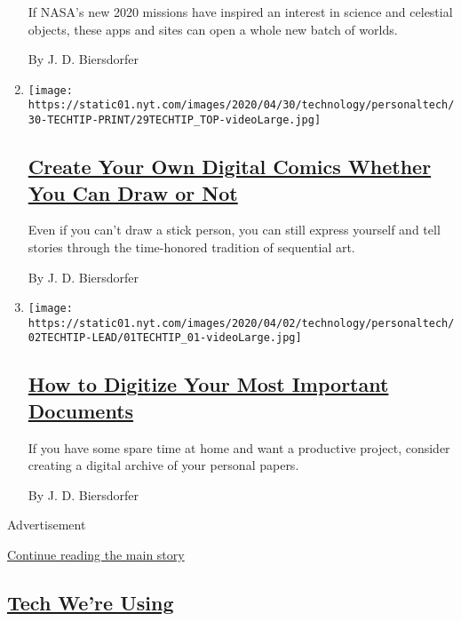 \begin{enumerate}
  If NASA's new 2020 missions have inspired an interest in science and
  celestial objects, these apps and sites can open a whole new batch of
  worlds.

  By J. D. Biersdorfer
\item
  \texttt{[image: https://static01.nyt.com/images/2020/04/30/technology/personaltech/30-TECHTIP-PRINT/29TECHTIP\_TOP-videoLarge.jpg]}

  \hypertarget{create-your-own-digital-comics-whether-you-can-draw-or-not}{%
  \subsection{\texorpdfstring{\href{/2020/04/29/technology/personaltech/create-your-own-digital-comics-whether-you-can-draw-or-not.html}{Create
  Your Own Digital Comics Whether You Can Draw or
  Not}}{Create Your Own Digital Comics Whether You Can Draw or Not}}\label{create-your-own-digital-comics-whether-you-can-draw-or-not}}

  Even if you can't draw a stick person, you can still express yourself
  and tell stories through the time-honored tradition of sequential art.

  By J. D. Biersdorfer
\item
  \texttt{[image: https://static01.nyt.com/images/2020/04/02/technology/personaltech/02TECHTIP-LEAD/01TECHTIP\_01-videoLarge.jpg]}

  \hypertarget{how-to-digitize-your-most-important-documents}{%
  \subsection{\texorpdfstring{\href{/2020/04/01/technology/personaltech/digitizing-important-documents.html}{How
  to Digitize Your Most Important
  Documents}}{How to Digitize Your Most Important Documents}}\label{how-to-digitize-your-most-important-documents}}

  If you have some spare time at home and want a productive project,
  consider creating a digital archive of your personal papers.

  By J. D. Biersdorfer
\end{enumerate}

Advertisement

\protect\hyperlink{after-mid1}{Continue reading the main story}

\hypertarget{tech-were-using}{%
\subsection{\texorpdfstring{\href{/column/tech-we-are-using}{Tech We're
Using}}{Tech We're Using}}\label{tech-were-using}}

